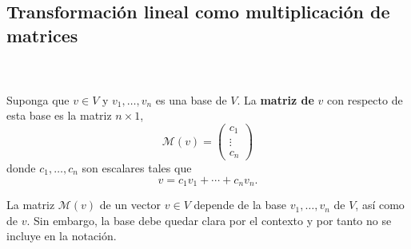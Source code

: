 \subsection{Transformación lineal como multiplicación de matrices}

\begin{mydef}\;\\\\
    Suponga que $v\in V$ y $v_1,\ldots,v_n$ es una base de $V$. La \textbf{matriz de} $v$ con respecto de esta base es la matriz $n\times 1$,
    $$\mathcal{M}(v)=
	\begin{pmatrix}
	    c_1\\
	    \vdots\\
	    c_n
	\end{pmatrix}
    $$
    donde $c_1,\ldots,c_n$ son escalares tales que
    $$v=c_1v_1+\cdots+c_nv_n.$$
\end{mydef}

La matriz $\mathcal{M}(v)$ de un vector $v\in V$ depende de la base $v_1,\ldots,v_n$ de $V$, así como de $v$. Sin embargo, la base debe quedar clara por el contexto y por tanto no se incluye en la notación.

